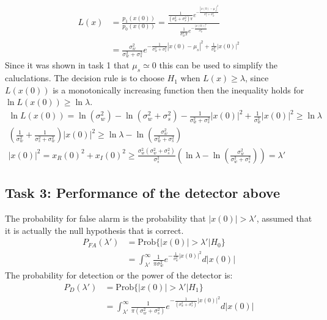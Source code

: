 \begin{align}
    L(x) & = \frac{p_1(x(0))}{p_0(x(0))} = \frac{\frac{1}{(\sigma_w^2+\sigma_s^2)\pi}e^{-\frac{|x(0)-\mu_s|^2}{\sigma_s^2+\sigma_w^2}}}{\frac{1}{\sigma_w^2\pi}e^{-\frac{|x(0)|^2}{\sigma_w^2}}}\nonumber\\
    & = \frac{\sigma_w^2}{\sigma_w^2+\sigma_s^2}e^{-\frac{1}{\sigma_w^2+\sigma_s^2}|x(0)-\mu_s|^2+\frac{1}{\sigma_w^2}|x(0)|^2}\nonumber
\end{align}
Since it was shown in task 1 that $\mu_s \simeq 0$ this can be used to simplify the caluclations. The decision rule is to choose $H_1$ when $L(x) \geq \lambda$, since $L(x(0))$ is a monotonically increasing function then the inequality holds for $\ln L(x(0)) \geq \ln\lambda$.
\begin{align}
    \ln L(x(0)) = \ln (\sigma_w^2)-\ln (\sigma_w^2+\sigma_s^2)-\frac{1}{\sigma_w^2+\sigma_s^2}|x(0)|^2+\frac{1}{\sigma_w^2}|x(0)|^2 \geq \ln\lambda\nonumber\\
    (\frac{1}{\sigma_w^2}+\frac{1}{\sigma_s^2+\sigma_w^2})|x(0)|^2 \geq \ln\lambda-\ln (\frac{\sigma_w^2}{\sigma_w^2+\sigma_s^2})\nonumber\\
    |x(0)|^2 = x_R(0)^2+x_I(0)^2 \geq \frac{\sigma_w^2(\sigma_w^2+\sigma_s^2)}{\sigma_s^2}(\ln\lambda-\ln (\frac{\sigma_w^2}{\sigma_w^2+\sigma_s^2})) = \lambda'\nonumber
\end{align}

\subsection{Task 3: Performance of the detector above}
The probability for false alarm is the probability that $|x(0)|>\lambda'$, assumed that it is actually the null hypothesis that is correct. 
\begin{align}
    P_{FA}(\lambda') & = \text{Prob}\{|x(0)|>\lambda'\vert H_0\}\nonumber\\
    & = \int_{\lambda'}^{\infty}\frac{1}{\pi\sigma_w^2}e^{-\frac{1}{\sigma_w^2}|x(0)|^2}d|x(0)|\nonumber
\end{align}
The probability for detection or the power of the detector is:
\begin{align}
    P_D(\lambda') & = \text{Prob}\{|x(0)|>\lambda'\vert H_1\}\nonumber\\
    & = \int_{\lambda'}^{\infty}\frac{1}{\pi(\sigma_w^2+\sigma_s^2)}e^{-\frac{1}{(\sigma_w^2+\sigma_s^2)}|x(0)|^2}d|x(0)|\nonumber
\end{align}
